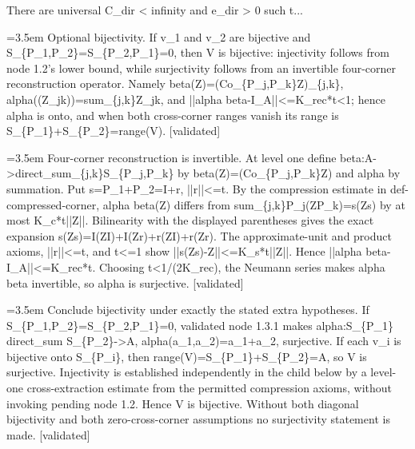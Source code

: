 \documentclass{article}
\newcommand{\step}[1]{\par\noindent\hangindent=3.5em\hangafter=1%
  \makebox[3.5em][l]{\textbf{#1.}}}
\newcommand{\steptag}[1]{\hfill{\small\textsf{[#1]}}}
\begin{document}
\begin{proofbox}{There are universal C\_dir < infinity and e\_dir > 0 such t...}
\step{1.3} Optional bijectivity. If v\_1 and v\_2 are bijective and S\_\{P\_1,P\_2\}=S\_\{P\_2,P\_1\}=0, then V is bijective: injectivity follows from node 1.2's lower bound, while surjectivity follows from an invertible four-corner reconstruction operator. Namely beta(Z)=(Co\_\{P\_j,P\_k\}Z)\_\{j,k\}, alpha((Z\_jk))=sum\_\{j,k\}Z\_jk, and ||alpha beta-I\_A||<=K\_rec*t<1; hence alpha is onto, and when both cross-corner ranges vanish its range is S\_\{P\_1\}+S\_\{P\_2\}=range(V). \steptag{validated} \\[6pt]
\step{1.3.1} Four-corner reconstruction is invertible. At level one define beta:A->direct\_sum\_\{j,k\}S\_\{P\_j,P\_k\} by beta(Z)=(Co\_\{P\_j,P\_k\}Z) and alpha by summation. Put s=P\_1+P\_2=I+r, ||r||<=t. By the compression estimate in def-compressed-corner, alpha beta(Z) differs from sum\_\{j,k\}P\_j(ZP\_k)=s(Zs) by at most K\_c*t||Z||. Bilinearity with the displayed parentheses gives the exact expansion s(Zs)=I(ZI)+I(Zr)+r(ZI)+r(Zr). The approximate-unit and product axioms, ||r||<=t, and t<=1 show ||s(Zs)-Z||<=K\_s*t||Z||. Hence ||alpha beta-I\_A||<=K\_rec*t. Choosing t<1/(2K\_rec), the Neumann series makes alpha beta invertible, so alpha is surjective. \steptag{validated} \\[4pt]
\step{1.3.2} Conclude bijectivity under exactly the stated extra hypotheses. If S\_\{P\_1,P\_2\}=S\_\{P\_2,P\_1\}=0, validated node 1.3.1 makes alpha:S\_\{P\_1\} direct\_sum S\_\{P\_2\}->A, alpha(a\_1,a\_2)=a\_1+a\_2, surjective. If each v\_i is bijective onto S\_\{P\_i\}, then range(V)=S\_\{P\_1\}+S\_\{P\_2\}=A, so V is surjective. Injectivity is established independently in the child below by a level-one cross-extraction estimate from the permitted compression axioms, without invoking pending node 1.2. Hence V is bijective. Without both diagonal bijectivity and both zero-cross-corner assumptions no surjectivity statement is made. \steptag{validated} \\[6pt]

\end{proofbox}
\end{document}
